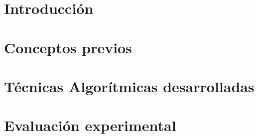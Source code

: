 \documentclass[spanish,a4paper,14pt,oneside]{extreport}
\begin{document}
\renewcommand{\thepage}{\roman{page}}
\setcounter{page}{1}


\tableofcontents

\newpage{\pagestyle{empty}}

\listoffigures

\newpage{\pagestyle{empty}}

\listoftables

\newpage{\pagestyle{empty}}

\renewcommand{\thepage}{\arabic{page}}
\setcounter{page}{1}


\chapter{Introducción}
\label{chapter:intro}




\chapter{Conceptos previos}
\label{chapter:dos}


\newpage{\pagestyle{empty}}
\thispagestyle{empty}

\chapter{Técnicas Algorítmicas desarrolladas}
\label{chapter:tres}




\chapter{Evaluación experimental}
\label{chapter:cuatro}
\end{document}
